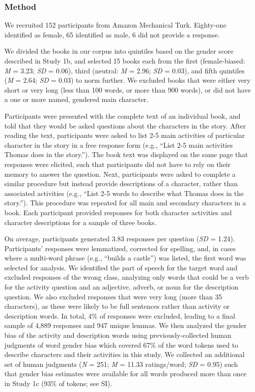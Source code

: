 \documentclass[
  english,
  ,man,floatsintext]{apa6}
\begin{document}
\hypertarget{method-2}{%
\subsubsection{Method}\label{method-2}}

We recruited 152 participants from Amazon Mechanical Turk. Eighty-one identified as female, 65 identified as male, 6 did not provide a response.

We divided the books in our corpus into quintiles based on the gender score described in Study 1b, and selected 15 books each from the first (female-biased: \emph{M} = 3.23; \emph{SD} = 0.06), third (neutral: \emph{M} = 2.96; \emph{SD} = 0.03), and fifth quintiles (\emph{M} = 2.64; \emph{SD} = 0.03) to norm further. We excluded books that were either very short or very long (less than 100 words, or more than 900 words), or did not have a one or more named, gendered main character.

Participants were presented with the complete text of an individual book, and told that they would be asked questions about the characters in the story. After reading the text, participants were asked to list 2-5 main activities of particular character in the story in a free response form (e.g., \enquote{List 2-5 main activities Thomas does in the story.}). The book text was displayed on the same page that responses were elicited, such that participants did not have to rely on their memory to answer the question. Next, participants were asked to complete a similar procedure but instead provide descriptions of a character, rather than associated activities (e.g., \enquote{List 2-5 words to describe what Thomas does in the story.}). This procedure was repeated for all main and secondary characters in a book. Each participant provided responses for both character activities and character descriptions for a sample of three books.

On average, participants generated 3.83 responses per question (\emph{SD} = 1.24). Participants' responses were lemmatized, corrected for spelling, and, in cases where a multi-word phrase (e.g., \enquote{builds a castle}) was listed, the first word was selected for analysis. We identified the part of speech for the target word and excluded responses of the wrong class, analyzing only words that could be a verb for the activity question and an adjective, adverb, or noun for the description question. We also excluded responses that were very long (more than 35 characters), as these were likely to be full sentences rather than activity or description words. In total, 4\% of responses were excluded, leading to a final sample of 4,889 responses and 947 unique lemmas. We then analyzed the gender bias of the activity and description words using previously-collected human judgments of word gender bias which covered 67\% of the word tokens used to describe characters and their activities in this study. We collected an additional set of human judgments (\emph{N} = 251; \emph{M} = 11.33 ratings/word; \emph{SD} = 0.95) such that gender bias estimates were available for all words produced more than once in Study 1c (93\% of tokens; see SI).
\end{document}

